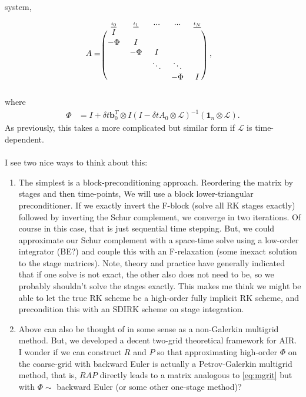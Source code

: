 \documentclass[a4paper,10pt]{article}
\begin{document}
system,
%
\begin{align*}
A & = \begin{blockarray}{c c c c c} \textnormal{\underline{\tiny{$t_0$}}} & \textnormal{\underline{\tiny{$t_1$}}} & ... &... &\textnormal{\underline{\tiny{$t_N$}}} \\
	\begin{block}{(c c c c c)}
	I & & & & \\
	-\Phi & I & & &\\
	 & -\Phi& I & & \\
	 &  & \ddots & \ddots  & \\
	 &  & & -\Phi & I \\
	\end{block}
	\end{blockarray} \hspace{1ex}, 
\end{align*}
%
where
%
\begin{align}\label{eq:mgrit}
\Phi & = I + \delta t\mathbf{b}_0^T\otimes I \left(I - \delta t A_0\otimes \mathcal{L}\right)^{-1} (\mathbf{1}_n \otimes \mathcal{L}).
\end{align}
%
As previously, this takes a more complicated but similar form if $\mathcal{L}$ is
time-dependent.\\
\\
I see two nice ways to think about this:
%
\begin{enumerate}
	\item The simplest is a block-preconditioning approach. Reordering the matrix by stages
	and then time-points, We will use a block lower-triangular preconditioner. If we exactly
	invert the F-block (solve all RK stages exactly) followed by inverting the Schur complement,
	we converge in two iterations. Of course in this case, that is just sequential time stepping.
	But, we could approximate our Schur complement with a space-time solve using a low-order 
	integrator (BE?) and couple this with an F-relaxation (some inexact solution to the
	stage matrices). Note, theory and practice have generally indicated that if one solve is
	not exact, the other also does not need to be, so we probably shouldn't solve the stages
	exactly. This makes me think we might be able to let the true RK scheme be a high-order
	fully implicit RK scheme, and precondition this with an SDIRK scheme on stage integration.

	\item Above can also be thought of in some sense as a non-Galerkin multigrid method.
	But, we developed a decent two-grid theoretical framework for AIR. I wonder if we can
	construct $R$ and $P$ so that approximating high-order $\Phi$ on the coarse-grid with
	backward Euler is actually a Petrov-Galerkin multigrid method, that is, $RAP$ directly
	leads to a matrix analogous to \eqref{eq:mgrit} but with $\Phi\sim$ backward Euler
	(or some other one-stage method)?

\end{enumerate}
\end{document}
